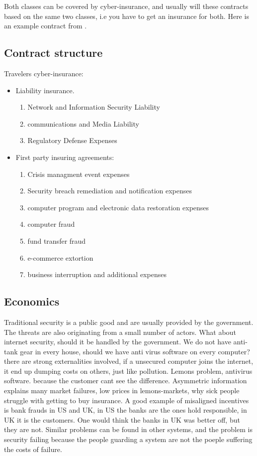 Both classes can be covered by cyber-insurance, and usually will these contracts based on the same two classes, i.e you have to get an insurance for both. 
Here is an example contract from \cite{travelers}.
\subsection{Contract structure}
Travelers cyber-insurance:
\begin{itemize}
\item Liability insurance. \begin{enumerate}
\item Network and Information Security Liability
\item communications and Media Liability
\item Regulatory Defense Expenses
\end{enumerate}
\item First party insuring agreements: \begin{enumerate}
\item Crisis managment event expenses
\item Security breach remediation and notification expenses
\item computer program and electronic data restoration expenses
\item computer fraud
\item fund transfer fraud
\item e-commerce extortion
\item business interruption and additional expenses
\end{enumerate}
\end{itemize}
\subsection{Economics}
Traditional security is a public good and are usually provided by the government. 
The threats are also originating from a small number of actors. 
What about internet security, should it be handled by the government.
 We do not have anti-tank gear in every house, should we have anti virus software on every computer?
 there are strong externalities involved, if a unsecured computer joins the internet, 
 it end up dumping costs on others, just like pollution. 
 Lemons problem, antivirus software. because the customer cant see the difference.
 Asymmetric information explains many market failures, low prices in lemons-markets, why sick people struggle with getting to buy insurance.
 A good example of misaligned incentives is bank frauds in US and UK, in US the banks are the ones hold responsible, in UK it is the customers. One would think the banks in UK was better off, but they are not. Similar problems can be found in other systems, and the problem is  security failing because the people guarding a system are not the poeple suffering the costs of failure. 
